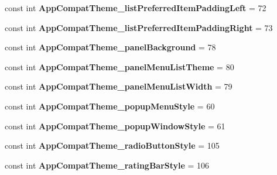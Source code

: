 \begin{DoxyCompactItemize}
\item 
\mbox{\label{classXaria_1_1Resource_1_1Styleable_a656e84b2d58d62fc4027146db3a2199b}} 
const int {\bfseries App\+Compat\+Theme\+\_\+list\+Preferred\+Item\+Padding\+Left} = 72
\item 
\mbox{\label{classXaria_1_1Resource_1_1Styleable_a0821263825c7a7d36aca01cdd84a36d1}} 
const int {\bfseries App\+Compat\+Theme\+\_\+list\+Preferred\+Item\+Padding\+Right} = 73
\item 
\mbox{\label{classXaria_1_1Resource_1_1Styleable_aae5de59a634316276db38cf885d598c3}} 
const int {\bfseries App\+Compat\+Theme\+\_\+panel\+Background} = 78
\item 
\mbox{\label{classXaria_1_1Resource_1_1Styleable_a1b2f9f3f81aad65e8d0474b3cdb56b65}} 
const int {\bfseries App\+Compat\+Theme\+\_\+panel\+Menu\+List\+Theme} = 80
\item 
\mbox{\label{classXaria_1_1Resource_1_1Styleable_ab8b2d055ca51500b33d73ab14da8e169}} 
const int {\bfseries App\+Compat\+Theme\+\_\+panel\+Menu\+List\+Width} = 79
\item 
\mbox{\label{classXaria_1_1Resource_1_1Styleable_afed4dc6222d25da7f1dc9a0bbc7c1536}} 
const int {\bfseries App\+Compat\+Theme\+\_\+popup\+Menu\+Style} = 60
\item 
\mbox{\label{classXaria_1_1Resource_1_1Styleable_a64934cd6c80ed67d1cbef097cc965630}} 
const int {\bfseries App\+Compat\+Theme\+\_\+popup\+Window\+Style} = 61
\item 
\mbox{\label{classXaria_1_1Resource_1_1Styleable_a47b7e48be1487130cd4f66db20d931a8}} 
const int {\bfseries App\+Compat\+Theme\+\_\+radio\+Button\+Style} = 105
\item 
\mbox{\label{classXaria_1_1Resource_1_1Styleable_a2e1552c610848343438a86a57f364939}} 
const int {\bfseries App\+Compat\+Theme\+\_\+rating\+Bar\+Style} = 106

\end{DoxyCompactItemize}
